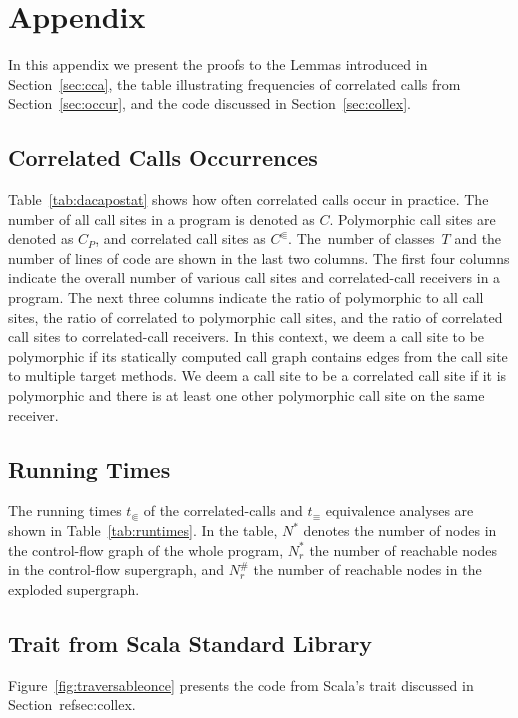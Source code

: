 \section{Appendix}
In this appendix we present the proofs to the Lemmas introduced in Section~\ref{sec:cca}, the table illustrating frequencies of correlated calls from Section~\ref{sec:occur}, and the code discussed in Section~\ref{sec:collex}.

\subsection{Correlated Calls Occurrences}
Table~\ref{tab:dacapostat} shows how often correlated calls occur in practice. The number of all call sites in a program is denoted as $C$. 
Polymorphic call sites are denoted as $C_P$, and correlated call sites as $C^\Subset$. The~number of classes~$T$ and the number of lines of code are shown in the last two columns.
The first four columns indicate the overall number of various call sites and correlated-call receivers in a program. 
The next three columns indicate the ratio of polymorphic to all call sites, the ratio of correlated to polymorphic call sites, and the ratio of correlated call sites to correlated-call receivers.
In this context, we deem a call site to be polymorphic if its statically computed call graph
contains edges from the call site to multiple target methods.
We deem a call site to be a correlated call site if it is polymorphic and there is
at least one other polymorphic call site on the same receiver.


\subsection{Running Times}
The running times $t_\Subset$ of the correlated-calls and $t_\equiv$ equivalence analyses are shown in Table~\ref{tab:runtimes}. In the table, $N^*$ denotes the number of nodes in the control-flow graph of the whole program, $N^*_r$ the number of reachable nodes in the control-flow supergraph, and $N^\#_r$ the number of reachable nodes in the exploded supergraph.


\subsection{ Trait from Scala Standard Library}
Figure~\ref{fig:traversableonce} presents the code from Scala's  trait discussed in Section~ref{sec:collex}.

